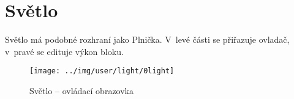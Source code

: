 
\section{Světlo}

Světlo má podobné rozhraní jako Plnička. V~levé části se přiřazuje ovladač, v~pravé se edituje výkon bloku.

\begin{figure}[!ht]\centering
\texttt{[image: ../img/user/light/0light]}

\caption{Světlo -- ovládací obrazovka}
\label{fig:user_light_0light}

\end{figure}

\FloatBarrier

